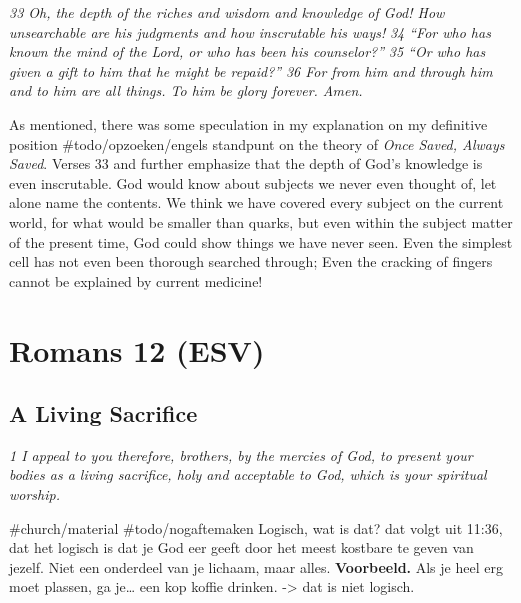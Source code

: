 \emph{33 Oh, the depth of the riches and wisdom and knowledge of God!
How unsearchable are his judgments and how inscrutable his ways!}
\emph{34 ``For who has known the mind of the Lord, or who has
been his counselor?''} \emph{35 ``Or who has given a gift to him\emph{
}that he might be repaid?''} \emph{36 For from him and through him and
to him are all things. To him be glory forever. Amen.}

As mentioned, there was some speculation in my explanation on my
definitive position \#todo/opzoeken/engels standpunt on the theory of
\emph{Once Saved, Always Saved}. Verses 33 and further emphasize that
the depth of God's knowledge is even inscrutable. God would know about
subjects we never even thought of, let alone name the contents. We think
we have covered every subject on the current world, for what would be
smaller than quarks, but even within the subject matter of the present
time, God could show things we have never seen. Even the simplest cell
has not even been thorough searched through; Even the cracking of
fingers cannot be explained by current medicine!



\hypertarget{romans-12-esv}{%
\newpage \section{Romans 12 (ESV)}\label{romans-12-esv}}
\vspace{10.5cm}
\subsection{A Living Sacrifice} \emph{1 I appeal to you therefore,
brothers, by the mercies of God, to present your bodies as a living
sacrifice, holy and acceptable to God, which is your spiritual
worship.}

\#church/material \#todo/nogaftemaken Logisch, wat is dat? dat volgt uit
11:36, dat het logisch is dat je God eer geeft door het meest kostbare
te geven van jezelf. Niet een onderdeel van je lichaam, maar alles.
\textbf{Voorbeeld.} Als je heel erg moet plassen, ga je\ldots{} een kop
koffie drinken. -\textgreater{} dat is niet logisch.

